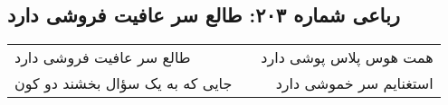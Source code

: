 \begin{center}
\section*{رباعی شماره ۲۰۳: طالع سر عافیت فروشی دارد}
\label{sec:sh203}
\begin{longtable}{l p{0.5cm} r}
طالع سر عافیت فروشی دارد
&&
همت هوس پلاس پوشی دارد
\\
جایی که به یک سؤال بخشند دو کون
&&
استغنایم سر خموشی دارد
\\
\end{longtable}
\end{center}
